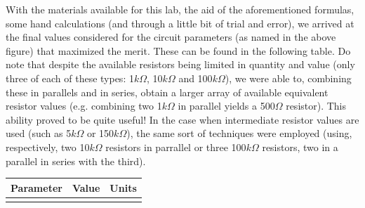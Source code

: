 With the materials available for this lab, the aid of the aforementioned formulas, some hand calculations (and through a little bit of trial and error), we arrived at the final values considered for the circuit parameters (as named in the above figure) that maximized the merit. These can be found in the following table. Do note that despite the available resistors being limited in quantity and value (only three of each of these types: 1$k\Omega$, 10$k\Omega$ and 100$k\Omega$), we were able to, combining these in parallels and in series, obtain a larger array of available equivalent resistor values (e.g. combining two 1$k\Omega$ in parallel yields a 500$\Omega$ resistor). This ability proved to be quite useful! In the case when intermediate resistor values are used (such as 5$k\Omega$ or 150$k\Omega$), the same sort of techniques were employed (using, respectively, two 10$k\Omega$ resistors in parrallel or three 100$k\Omega$ resistors, two in a parallel in series with the third).

\hfill
 \parbox{1\linewidth}{
  \centering
  \begin{tabular}{|l|l|r|}
    \hline    
    {\bf Parameter} & {\bf Value} & {\bf Units }\\ \hline
    
  \label{tab:params}
  \end{tabular}
  }
\par

